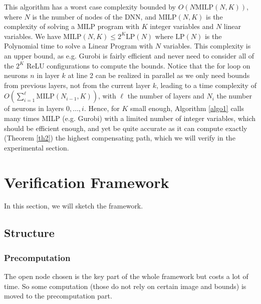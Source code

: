 \documentclass{llncs}
\newcommand{\MILP}{{\textrm{MILP}}}
\newcommand{\LP}{{\textrm{LP}}}
\begin{document}
	
	

This algorithm has a worst case complexity bounded by $O(N \MILP(N,K))$, 
where $N$ is the number of nodes of the DNN, 
and $\MILP(N,K)$ is the complexity of solving a MILP program with $K$ integer variables and $N$ linear variables.
We have $\MILP(N,K) \leq 2^K \LP(N)$ where $\LP(N)$ is the Polynomial time to solve a Linear Program with $N$ variables.
This complexity is an upper bound, as e.g. Gurobi is fairly efficient and never need to consider all of the $2^K$ ReLU configurations to compute the bounds.
Notice that the for loop on neurons $n$ in layer $k$ at line 2 can be realized in parallel as we only need bounds from previous layers, not from the current layer $k$, 
leading to a time complexity of $O(\sum_{i=1}^{\ell} \MILP(N_{i-1},K))$, with $\ell$ the number of layers and $N_i$ the number of neurons in layers $0, \ldots, i$.
Hence, for $K$ small enough, Algorithm \ref{algo1} calls many times MILP (e.g. Gurobi)
with a limited number of integer variables, which should be efficient enough, and yet be quite accurate as it can compute exactly (Theorem \ref{th2}) the highest compensating path, which we will verify in the experimental section.





\iffalse
\section{Verification Framework}




In this section, we will sketch the framework. 

\subsection{Structure}

\subsubsection*{Precomputation}

The open node chosen is the key part of the whole framework but costs a lot of time. So some computation (those do not rely on certain image and bounds) is moved to the precomputation part.

%
\end{document}

